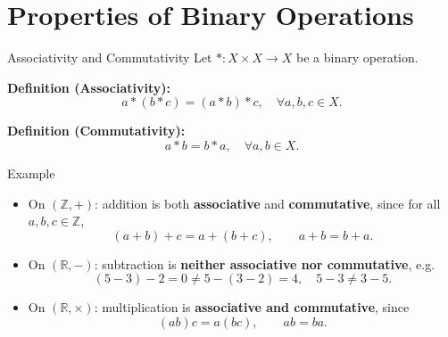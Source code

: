 \section{Properties of Binary Operations}

\begin{frame}{Associativity and Commutativity}
\vspace{-0.3cm}
Let \( *: X\times X \to X \) be a binary operation.

\textbf{Definition (Associativity):}
\[
a * (b * c) = (a * b) * c, \quad \forall a,b,c \in X.
\]

\textbf{Definition (Commutativity):}
\[
a * b = b * a, \quad \forall a,b \in X.
\]

\begin{center}
\end{center}
\end{frame}

\begin{frame}{Example}

\begin{block}{}
    \begin{itemize}
  \item On \((\mathbb{Z}, +)\): addition is both \textbf{associative} and \textbf{commutative}, since for all \(a,b,c \in \mathbb{Z}\),
  \[
  (a+b)+c = a+(b+c), \qquad a+b = b+a.
  \]
  \item On \((\mathbb{R}, -)\): subtraction is \textbf{neither associative nor commutative}, e.g.
  \[
  (5-3)-2 = 0 \neq 5-(3-2)=4, \quad 5-3 \neq 3-5.
  \]
  \item On \((\mathbb{R}, \times)\): multiplication is \textbf{associative and commutative}, since
  \[
  (a b)c = a(b c), \qquad a b = b a.
  \]
\end{itemize}
\end{block}
\end{frame}

